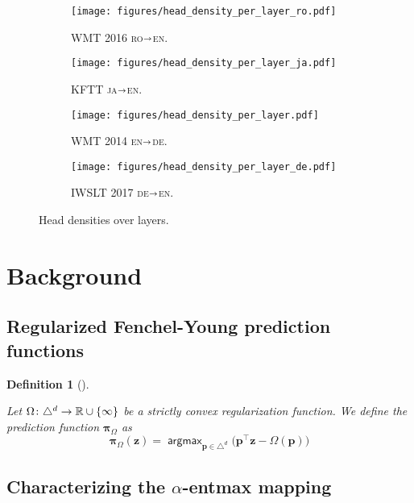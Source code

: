 \documentclass[11pt,a4paper]{article}
\newtheorem{definition}{Definition}
\newcommand{\amap}{\bm{\pi}}
\newcommand{\simplex}{\triangle}
\newcommand\pp{p}
\newcommand\p{\bm{\pp}}
\newcommand\xx{z}
\newcommand\x{\bm{\xx}}
\DeclareMathOperator*{\argmax}{\mathsf{argmax}}
\newcommand*\entmaxtext{entmax\xspace}
\newcommand{\langp}[2]{\textsc{#1}$\shortrightarrow$\textsc{#2}}
\begin{document}
\begin{figure}[h!]
    \centering
    \begin{subfigure}[b]{.47\linewidth}
    \texttt{[image: figures/head\_density\_per\_layer\_ro.pdf]}
    \caption{\label{fig:head_density_per_layer_ro}WMT 2016 \langp{ro}{en}.}
\end{subfigure}
\begin{subfigure}[b]{.47\linewidth}
    \texttt{[image: figures/head\_density\_per\_layer\_ja.pdf]}
    \caption{\label{fig:head_density_per_layer_ja}KFTT \langp{ja}{en}.}
\end{subfigure}

\begin{subfigure}[b]{.47\linewidth}
    \texttt{[image: figures/head\_density\_per\_layer.pdf]}
    \caption{\label{fig:head_density_per_layer_en}WMT 2014 \langp{en}{de}.}
\end{subfigure}
\begin{subfigure}[b]{.47\linewidth}
    \texttt{[image: figures/head\_density\_per\_layer\_de.pdf]}
    \caption{\label{fig:head_density_per_layer_de}IWSLT 2017 \langp{de}{en}.}
\end{subfigure}
\caption{Head densities over layers.}
\label{fig:head_density_per_layer_lps}
\end{figure}

\clearpage

\section{Background}

\subsection{Regularized Fenchel-Young prediction functions}
\begin{definition}[\citealt{blondel2019learning}]\label{def:rpf}

Let $\Omega \colon \simplex^d \to \RR \cup \{\infty\}$ be a strictly convex
regularization function. We define the prediction function $\amap_{\Omega}$ as
\begin{equation}
\amap_{\Omega}(\x) = \argmax_{\p \in \simplex^d}
    \big(\p^\top\x - \Omega(\p)\big)
\label{eq:amap}
\end{equation}
\end{definition}

\subsection{Characterizing the {\boldmath $\alpha$-\entmaxtext} mapping}\label{sec:bgform}
\end{document}
